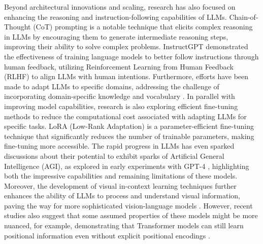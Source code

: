 Beyond architectural innovations and scaling, research has also focused on enhancing the reasoning and instruction-following capabilities of LLMs. Chain-of-Thought (CoT) prompting is a notable technique that elicits complex reasoning in LLMs by encouraging them to generate intermediate reasoning steps, improving their ability to solve complex problems. InstructGPT demonstrated the effectiveness of training language models to better follow instructions through human feedback, utilizing Reinforcement Learning from Human Feedback (RLHF) to align LLMs with human intentions. Furthermore, efforts have been made to adapt LLMs to specific domains, addressing the challenge of incorporating domain-specific knowledge and vocabulary \cite{AdaptingLM}. In parallel with improving model capabilities, research is also exploring efficient fine-tuning methods to reduce the computational cost associated with adapting LLMs for specific tasks. LoRA (Low-Rank Adaptation) \cite{Hu2021} is a parameter-efficient fine-tuning technique that significantly reduces the number of trainable parameters, making fine-tuning more accessible. The rapid progress in LLMs has even sparked discussions about their potential to exhibit sparks of Artificial General Intelligence (AGI), as explored in early experiments with GPT-4 \cite{Bubeck2023}, highlighting both the impressive capabilities and remaining limitations of these models.  Moreover, the development of visual in-context learning techniques further enhances the ability of LLMs to process and understand visual information, paving the way for more sophisticated vision-language models \cite{zhou2024visual}. However, recent studies also suggest that some assumed properties of these models might be more nuanced, for example, demonstrating that Transformer models can still learn positional information even without explicit positional encodings \cite{TransformerWithoutPE}.